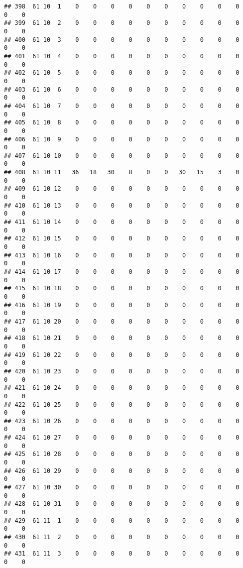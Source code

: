 \documentclass[]{article}
\begin{document}
\begin{verbatim}
## 398  61 10  1    0    0    0    0    0    0    0    0    0    0    0    0
## 399  61 10  2    0    0    0    0    0    0    0    0    0    0    0    0
## 400  61 10  3    0    0    0    0    0    0    0    0    0    0    0    0
## 401  61 10  4    0    0    0    0    0    0    0    0    0    0    0    0
## 402  61 10  5    0    0    0    0    0    0    0    0    0    0    0    0
## 403  61 10  6    0    0    0    0    0    0    0    0    0    0    0    0
## 404  61 10  7    0    0    0    0    0    0    0    0    0    0    0    0
## 405  61 10  8    0    0    0    0    0    0    0    0    0    0    0    0
## 406  61 10  9    0    0    0    0    0    0    0    0    0    0    0    0
## 407  61 10 10    0    0    0    0    0    0    0    0    0    0    0    0
## 408  61 10 11   36   18   30    8    0    0   30   15    3    0    0    0
## 409  61 10 12    0    0    0    0    0    0    0    0    0    0    0    0
## 410  61 10 13    0    0    0    0    0    0    0    0    0    0    0    0
## 411  61 10 14    0    0    0    0    0    0    0    0    0    0    0    0
## 412  61 10 15    0    0    0    0    0    0    0    0    0    0    0    0
## 413  61 10 16    0    0    0    0    0    0    0    0    0    0    0    0
## 414  61 10 17    0    0    0    0    0    0    0    0    0    0    0    0
## 415  61 10 18    0    0    0    0    0    0    0    0    0    0    0    0
## 416  61 10 19    0    0    0    0    0    0    0    0    0    0    0    0
## 417  61 10 20    0    0    0    0    0    0    0    0    0    0    0    0
## 418  61 10 21    0    0    0    0    0    0    0    0    0    0    0    0
## 419  61 10 22    0    0    0    0    0    0    0    0    0    0    0    0
## 420  61 10 23    0    0    0    0    0    0    0    0    0    0    0    0
## 421  61 10 24    0    0    0    0    0    0    0    0    0    0    0    0
## 422  61 10 25    0    0    0    0    0    0    0    0    0    0    0    0
## 423  61 10 26    0    0    0    0    0    0    0    0    0    0    0    0
## 424  61 10 27    0    0    0    0    0    0    0    0    0    0    0    0
## 425  61 10 28    0    0    0    0    0    0    0    0    0    0    0    0
## 426  61 10 29    0    0    0    0    0    0    0    0    0    0    0    0
## 427  61 10 30    0    0    0    0    0    0    0    0    0    0    0    0
## 428  61 10 31    0    0    0    0    0    0    0    0    0    0    0    0
## 429  61 11  1    0    0    0    0    0    0    0    0    0    0    0    0
## 430  61 11  2    0    0    0    0    0    0    0    0    0    0    0    0
## 431  61 11  3    0    0    0    0    0    0    0    0    0    0    0    0

\end{verbatim}
\end{document}
